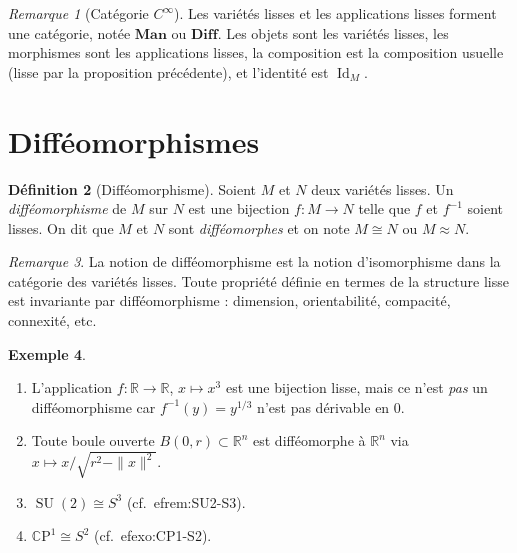 \documentclass[12pt,a4paper,openany]{book}
\theoremstyle{definition}
\newtheorem{definition}{Définition}[chapter]
\newtheorem{exemple}[definition]{Exemple}
\theoremstyle{plain}
\theoremstyle{remark}
\newtheorem{remarque}[definition]{Remarque}
\newcommand{\R}{\mathbb{R}}
\newcommand{\CP}{\mathbb{C}\mathrm{P}}
\DeclareMathOperator{\Id}{Id}
\DeclareMathOperator{\SU}{SU}
\begin{document}
\begin{remarque}[Catégorie $C^\infty$]\label{rem:categorie-lisse}
Les variétés lisses et les applications lisses forment une catégorie, notée
$\mathbf{Man}$ ou $\mathbf{Diff}$. Les objets sont
les variétés lisses, les morphismes sont les applications lisses, la composition
est la composition usuelle (lisse par la proposition précédente), et l'identité
est $\Id_M$.
\end{remarque}


\section{Difféomorphismes}
\label{sec:diffeomorphismes}

\begin{definition}[Difféomorphisme]\label{def:diffeomorphisme}
Soient $M$ et $N$ deux variétés lisses. Un \emph{difféomorphisme} de $M$ sur
$N$ est une bijection $f \colon M \to N$ telle que $f$ et $f^{-1}$ soient
lisses. On dit que $M$ et $N$ sont \emph{difféomorphes} et on note $M \cong N$
ou $M \approx N$.
\end{definition}

\begin{remarque}\label{rem:diffeo-invariance}
La notion de difféomorphisme est la notion d'isomorphisme dans la catégorie des
variétés lisses. Toute propriété définie en termes de la structure lisse est
invariante par difféomorphisme : dimension, orientabilité, compacité,
connexité, etc.
\end{remarque}

\begin{exemple}\label{ex:diffeomorphismes}
\begin{enumerate}[label=(\alph*)]
    \item L'application $f \colon \R \to \R$, $x \mapsto x^3$ est une bijection
    lisse, mais ce n'est \emph{pas} un difféomorphisme car $f^{-1}(y) = y^{1/3}$
    n'est pas dérivable en $0$.
    \item Toute boule ouverte $B(0, r) \subset \R^n$ est difféomorphe à $\R^n$
    via $x \mapsto x / \sqrt{r^2 - \|x\|^2}$.
    \item $\SU(2) \cong S^3$ (cf.\ 
ef{rem:SU2-S3}).
    \item $\CP^1 \cong S^2$ (cf.\ 
ef{exo:CP1-S2}).
\end{enumerate}
\end{exemple}
\end{document}

